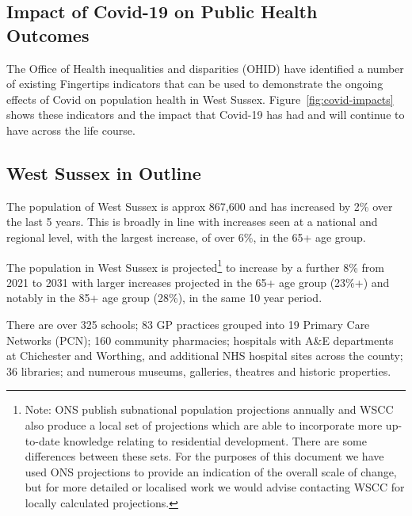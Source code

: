 
\subsection{Impact of Covid-19 on Public Health Outcomes}
The Office of Health inequalities and disparities (OHID) have identified a number of existing Fingertips indicators that can be used to demonstrate the ongoing effects of Covid on population health in West Sussex. Figure~\ref{fig:covid-impacts} shows these indicators and the impact that Covid-19 has had and will continue to have across the life course.





\subsection{West Sussex in Outline} %
The population of West Sussex is approx 867,600 and has increased by 2\% over the last 5 years. This is broadly in line with increases seen at a national and regional level, with the largest increase, of over 6\%, in the 65+ age group.

The population in West Sussex is projected\footnote{Note: ONS publish subnational population projections annually and WSCC also produce a local set of projections which are able to incorporate more up-to-date knowledge relating to residential development. There are some differences between these sets. For the purposes of this document we have used ONS projections to provide an indication of the overall scale of change, but for more detailed or localised work we would advise contacting WSCC for locally calculated projections.} to increase by a further 8\% from 2021 to 2031 with larger increases projected in the 65+ age group (23\%+) and notably in the 85+ age group (28\%), in the same 10 year period.

There are over 325 schools; 83 GP practices grouped into 19 Primary Care Networks (PCN); 160 community pharmacies; hospitals with A\&E departments at Chichester and Worthing, and additional NHS hospital sites across the county; 36 libraries; and numerous museums, galleries, theatres and historic properties.

